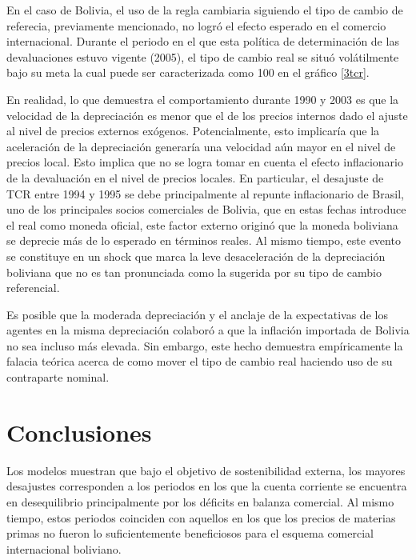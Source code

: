 \documentclass[12pt,letterpaper]{article}
\begin{document}
En el caso de Bolivia, el uso de la regla cambiaria siguiendo el tipo de cambio de referecia, previamente mencionado, no logró el efecto esperado en el comercio internacional. Durante el periodo en el que esta política de determinación de las devaluaciones estuvo vigente (2005), el tipo de cambio real se situó volátilmente bajo su meta la cual puede ser caracterizada como 100 en el gráfico \ref{3tcr}.

En realidad, lo que demuestra el comportamiento durante 1990 y 2003 es que la velocidad de la depreciación es menor que el de los precios internos dado el ajuste al nivel de precios externos exógenos. Potencialmente, esto implicaría que la aceleración de la depreciación generaría una velocidad aún mayor en el nivel de precios local. Esto implica que no se logra tomar en cuenta el efecto inflacionario de la devaluación en el nivel de precios locales. En particular, el desajuste de TCR entre 1994 y 1995 se debe principalmente al repunte inflacionario de Brasil, uno de los principales socios comerciales de Bolivia, que en estas fechas introduce el real como moneda oficial, este factor externo originó que la moneda boliviana se deprecie más de lo esperado en términos reales. Al mismo tiempo, este evento se constituye en un shock que marca la leve desaceleración de la depreciación boliviana que no es tan pronunciada como la sugerida por su tipo de cambio referencial.

Es posible que la moderada depreciación y el anclaje de la expectativas de los agentes en la misma depreciación colaboró a que la inflación importada de Bolivia no sea incluso más elevada. Sin embargo, este hecho demuestra empíricamente la falacia teórica acerca de como mover el tipo de cambio real haciendo uso de su contraparte nominal.











\section*{Conclusiones}\label{concl}

Los modelos muestran que bajo el objetivo de sostenibilidad externa, los mayores desajustes corresponden a los periodos en los que la cuenta corriente se encuentra en desequilibrio principalmente por los déficits en balanza comercial. Al mismo tiempo, estos periodos coinciden con aquellos en los que los precios de materias primas no fueron lo suficientemente beneficiosos para el esquema comercial internacional boliviano.
\end{document}
